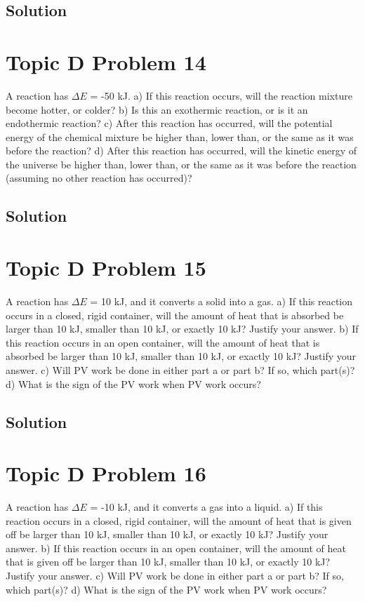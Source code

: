 \documentclass[10pt]{article}
\begin{document}
        \subsection{Solution}

    \pagebreak
    \section{Topic D Problem 14}
        A reaction has $\Delta E$ = -50 kJ.
a) If this reaction occurs, will the reaction mixture become hotter, or colder?
b) Is this an exothermic reaction, or is it an endothermic reaction?
c) After this reaction has occurred, will the potential energy of the chemical mixture be
higher than, lower than, or the same as it was before the reaction?
d) After this reaction has occurred, will the kinetic energy of the universe be higher than,
lower than, or the same as it was before the reaction (assuming no other reaction has
occurred)?
        
        \subsection{Solution}

    \pagebreak
    \section{Topic D Problem 15}
        A reaction has $\Delta E$ = 10 kJ, and it converts a solid into a gas.
a) If this reaction occurs in a closed, rigid container, will the amount of heat that is absorbed
be larger than 10 kJ, smaller than 10 kJ, or exactly 10 kJ? Justify your answer.
b) If this reaction occurs in an open container, will the amount of heat that is absorbed be
larger than 10 kJ, smaller than 10 kJ, or exactly 10 kJ? Justify your answer.
c) Will PV work be done in either part a or part b? If so, which part(s)?
d) What is the sign of the PV work when PV work occurs?
        
        \subsection{Solution}

    \pagebreak
    \section{Topic D Problem 16}
        A reaction has $\Delta E$ = -10 kJ, and it converts a gas into a liquid.
a) If this reaction occurs in a closed, rigid container, will the amount of heat that is given off
be larger than 10 kJ, smaller than 10 kJ, or exactly 10 kJ? Justify your answer.
b) If this reaction occurs in an open container, will the amount of heat that is given off be
larger than 10 kJ, smaller than 10 kJ, or exactly 10 kJ? Justify your answer.
c) Will PV work be done in either part a or part b? If so, which part(s)?
d) What is the sign of the PV work when PV work occurs?
        
\end{document}
